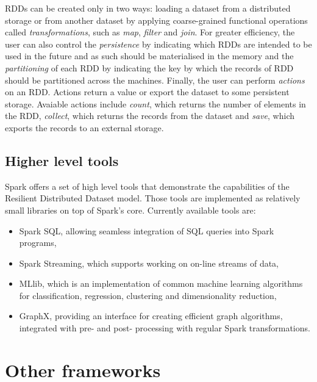 RDDs can be created only in two ways: loading a dataset from a distributed storage or from another dataset by applying coarse-grained functional operations called \emph{transformations}, such as \emph{map}, \emph{filter} and \emph{join}. For greater efficiency, the user can also control the \emph{persistence} by indicating which RDDs are intended to be used in the future and as such should be materialised in the memory and the \emph{partitioning} of each RDD by indicating the key by which the records of RDD should be partitioned across the machines. Finally, the user can perform \emph{actions} on an RDD. Actions return a value or export the dataset to some persistent storage. Avaiable actions include \emph{count}, which returns the number of elements in the RDD, \emph{collect}, which returns the records from the dataset and \emph{save}, which exports the records to an external storage.


\subsection{Higher level tools}
Spark offers a set of high level tools that demonstrate the capabilities of the Resilient Distributed Dataset model. Those tools are implemented as relatively small libraries on top of Spark's core. Currently available tools are:
\begin{itemize}
\item Spark SQL, allowing seamless integration of SQL queries into Spark programs,
\item Spark Streaming, which supports working on on-line streams of data,
\item MLlib, which is an implementation of common machine learning algorithms for classification, regression, clustering and dimensionality reduction,
\item GraphX, providing an interface for creating efficient graph algorithms, integrated with pre- and post- processing with regular Spark transformations.
\end{itemize}

\section{Other frameworks}


